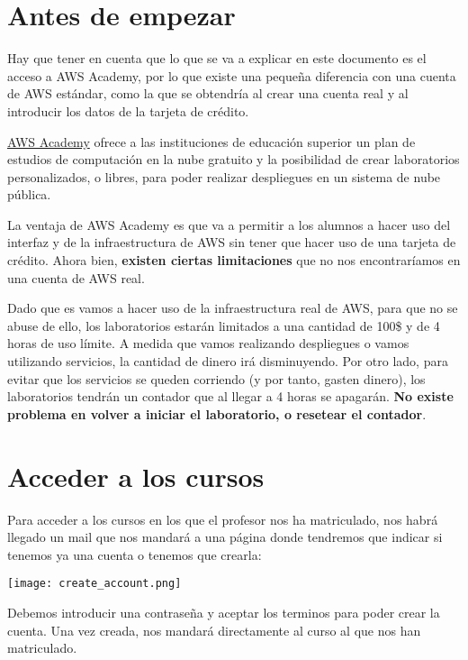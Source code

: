 \chapter{Antes de empezar}

Hay que tener en cuenta que lo que se va a explicar en este documento es el acceso a AWS Academy, por lo que existe una pequeña diferencia con una cuenta de AWS estándar, como la que se obtendría al crear una cuenta real y al introducir los datos de la tarjeta de crédito.

\href{https://aws.amazon.com/es/training/awsacademy/}{AWS Academy} ofrece a las instituciones de educación superior un plan de estudios de computación en la nube gratuito y la posibilidad de crear laboratorios personalizados, o libres, para poder realizar despliegues en un sistema de nube pública.

La ventaja de AWS Academy es que va a permitir a los alumnos a hacer uso del interfaz y de la infraestructura de AWS sin tener que hacer uso de una tarjeta de crédito. Ahora bien, \textbf{existen ciertas limitaciones} que no nos encontraríamos en una cuenta de AWS real.

Dado que es vamos a hacer uso de la infraestructura real de AWS, para que no se abuse de ello, los laboratorios estarán limitados a una cantidad de 100\$ y de 4 horas de uso límite. A medida que vamos realizando despliegues o vamos utilizando servicios, la cantidad de dinero irá disminuyendo. Por otro lado, para evitar que los servicios se queden corriendo (y por tanto, gasten dinero), los laboratorios tendrán un contador que al llegar a 4 horas se apagarán. \textbf{No existe problema en volver a iniciar el laboratorio, o resetear el contador}.


\chapter{Acceder a los cursos}

Para acceder a los cursos en los que el profesor nos ha matriculado, nos habrá llegado un mail que nos mandará a una página donde tendremos que indicar si tenemos ya una cuenta o tenemos que crearla:

\begin{center}
	\texttt{[image: create\_account.png]}
\end{center}

Debemos introducir una contraseña y aceptar los terminos para poder crear la cuenta. Una vez creada, nos mandará directamente al curso al que nos han matriculado.

